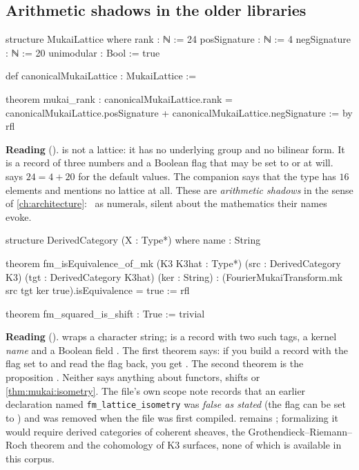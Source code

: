 \subsection{Arithmetic shadows in the older libraries}
\begin{leanbox}
\begin{leancode}
structure MukaiLattice where
  rank : ℕ := 24
  posSignature : ℕ := 4
  negSignature : ℕ := 20
  unimodular : Bool := true

def canonicalMukaiLattice : MukaiLattice := {}

theorem mukai_rank :
    canonicalMukaiLattice.rank = canonicalMukaiLattice.posSignature +
    canonicalMukaiLattice.negSignature := by rfl
\end{leancode}
\textbf{Reading} ().
 is not a lattice: it has no underlying group and no bilinear form. It is a
record of three numbers and a Boolean flag that may be set to  or  at
will.  says $24=4+20$ for the default values. The companion
 says that the type  has $16$ elements and mentions
no lattice at all. These are \emph{arithmetic shadows} in the sense of \cref{ch:architecture}:
\TA\ as numerals, silent about the mathematics their names evoke.
\end{leanbox}

\begin{leanbox}
\begin{leancode}
structure DerivedCategory (X : Type*) where
  name : String

theorem fm_isEquivalence_of_mk (K3 K3hat : Type*)
    (src : DerivedCategory K3) (tgt : DerivedCategory K3hat)
    (ker : String) :
    (FourierMukaiTransform.mk src tgt ker true).isEquivalence = true := rfl

theorem fm_squared_is_shift :
    True := trivial
\end{leancode}
\textbf{Reading} ().
 wraps a character string;  is a record with
two such tags, a kernel \emph{name} and a Boolean field . The first theorem
says: if you build a record with the flag set to  and read the flag back, you get
. The second theorem is the proposition . Neither says anything about
functors, shifts or \cref{thm:mukai:isometry}. The file's own scope note records that an earlier
declaration named \texttt{fm\_lattice\_isometry} was \emph{false as stated} (the flag can be set to
) and was removed when the file was first compiled. 
remains \TL; formalizing it would require derived categories of coherent sheaves, the
Grothendieck--Riemann--Roch theorem and the cohomology of K3 surfaces, none of which is
available in this corpus.
\end{leanbox}

